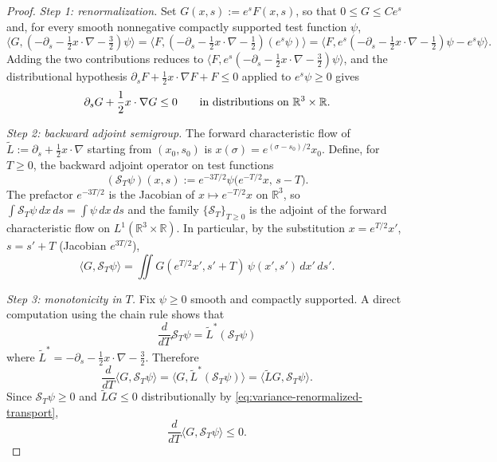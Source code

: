 \documentclass[11pt]{amsart}
\numberwithin{equation}{section}
\theoremstyle{plain}
\theoremstyle{definition}
\theoremstyle{remark}
\begin{document}
\begin{proof}
\emph{Step 1: renormalization.}  Set \(G(x,s):=e^{s}F(x,s)\), so that
\(0\le G\le Ce^{s}\) and, for every smooth nonnegative compactly supported
test function \(\psi\),
\[
   \langle G,(-\partial_s-\tfrac12 x\cdot\nabla-\tfrac32)\psi\rangle
   =\langle F,(-\partial_s-\tfrac12 x\cdot\nabla-\tfrac12)(e^s\psi)\rangle
   =\langle F,e^s(-\partial_s-\tfrac12 x\cdot\nabla-\tfrac12)\psi
            -e^s\psi\rangle.
\]
Adding the two contributions reduces to
\(\langle F,e^s(-\partial_s-\frac12 x\cdot\nabla-\frac32)\psi\rangle\), and the
distributional hypothesis \(\partial_sF+\frac12 x\cdot\nabla F+F\le0\) applied
to \(e^s\psi\ge0\) gives
\begin{equation}\label{eq:variance-renormalized-transport}
   \partial_sG+\frac12 x\cdot\nabla G\le 0
   \qquad\hbox{in distributions on }\mathbb R^3\times\mathbb R .
\end{equation}

\emph{Step 2: backward adjoint semigroup.}  The forward characteristic flow of
\(\widetilde L:=\partial_s+\frac12 x\cdot\nabla\) starting from \((x_0,s_0)\) is
\(x(\sigma)=e^{(\sigma-s_0)/2}x_0\).  Define, for \(T\ge 0\), the backward
adjoint operator on test functions
\[
   (\mathcal S_T\psi)(x,s)
   :=
   e^{-3T/2}\psi\!\bigl(e^{-T/2}x,\,s-T\bigr) .
\]
The prefactor \(e^{-3T/2}\) is the Jacobian of \(x\mapsto e^{-T/2}x\)
on \(\mathbb R^3\), so \(\int\mathcal S_T\psi\,dx\,ds=\int\psi\,dx\,ds\) and
the family \(\{\mathcal S_T\}_{T\ge 0}\) is the adjoint of the forward
characteristic flow on \(L^1(\mathbb R^3\times\mathbb R)\).  In particular, by
the substitution \(x=e^{T/2}x'\), \(s=s'+T\) (Jacobian \(e^{3T/2}\)),
\begin{equation}\label{eq:variance-pairing-substitution}
   \langle G,\mathcal S_T\psi\rangle
   =\iint G(e^{T/2}x',s'+T)\,\psi(x',s')\,dx'\,ds' .
\end{equation}

\emph{Step 3: monotonicity in \(T\).}  Fix \(\psi\ge 0\) smooth and compactly
supported.  A direct computation using the chain rule shows that
\[
   \frac{d}{dT}\mathcal S_T\psi
   =
   \widetilde L^\ast(\mathcal S_T\psi)
\]
where \(\widetilde L^\ast=-\partial_s-\frac12 x\cdot\nabla-\frac32\).
Therefore
\[
   \frac{d}{dT}\langle G,\mathcal S_T\psi\rangle
   =\langle G,\widetilde L^\ast(\mathcal S_T\psi)\rangle
   =\langle \widetilde L G,\mathcal S_T\psi\rangle .
\]
Since \(\mathcal S_T\psi\ge 0\) and \(\widetilde L G\le 0\) distributionally by
\eqref{eq:variance-renormalized-transport},
\begin{equation}\label{eq:variance-monotone}
   \frac{d}{dT}\langle G,\mathcal S_T\psi\rangle\le 0 .
\end{equation}


\end{proof}
\end{document}
